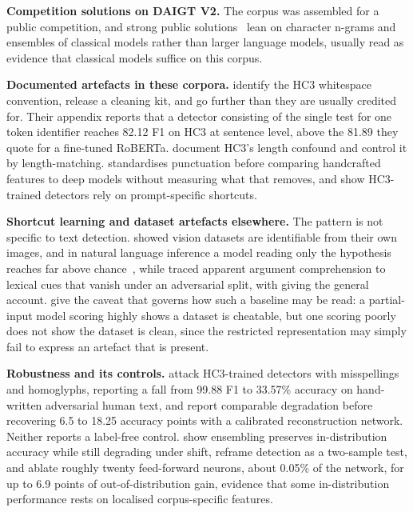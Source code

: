 \documentclass[conference,a4paper]{IEEEtran}
\begin{document}
\textbf{Competition solutions on DAIGT V2.} The corpus was assembled for a public competition, and strong public solutions~\cite{Zain2025multi} lean on character n-grams and ensembles of classical models rather than larger language models, usually read as evidence that classical models suffice on this corpus.

\textbf{Documented artefacts in these corpora.} \citet{Tian2023multiscale} identify the HC3 whitespace convention, release a cleaning kit, and go further than they are usually credited for. Their appendix reports that a detector consisting of the single test for one token identifier reaches 82.12 F1 on HC3 at sentence level, above the 81.89 they quote for a fine-tuned RoBERTa. \citet{Baidya2026detecting} document HC3's length confound and control it by length-matching. \citet{Ardeshirifar2025comparing} standardises punctuation before comparing handcrafted features to deep models without measuring what that removes, and \citet{Park2024investigating} show HC3-trained detectors rely on prompt-specific shortcuts.

\textbf{Shortcut learning and dataset artefacts elsewhere.} The pattern is not specific to text detection. \citet{Torralba2011unbiased} showed vision datasets are identifiable from their own images, and in natural language inference a model reading only the hypothesis reaches far above chance~\cite{Gururangan2018annotation,Poliak2018hypothesis}, while \citet{Niven2019probing} traced apparent argument comprehension to lexical cues that vanish under an adversarial split, with \citet{Geirhos2020shortcut} giving the general account. \citet{Feng2019misleading} give the caveat that governs how such a baseline may be read: a partial-input model scoring highly shows a dataset is cheatable, but one scoring poorly does not show the dataset is clean, since the restricted representation may simply fail to express an artefact that is present.

\textbf{Robustness and its controls.} \citet{Antoun2023towards} attack HC3-trained detectors with misspellings and homoglyphs, reporting a fall from 99.88 F1 to 33.57\% accuracy on hand-written adversarial human text, and \citet{Huang2024generated} report comparable degradation before recovering 6.5 to 18.25 accuracy points with a calibrated reconstruction network. Neither reports a label-free control. \citet{Lai2024adaptive} show ensembling preserves in-distribution accuracy while still degrading under shift, \citet{Zhang2024detecting} reframe detection as a two-sample test, and \citet{Borile2025generalize} ablate roughly twenty feed-forward neurons, about 0.05\% of the network, for up to 6.9 points of out-of-distribution gain, evidence that some in-distribution performance rests on localised corpus-specific features.
\end{document}
